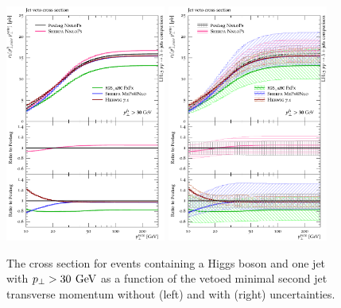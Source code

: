 \begin{figure}[t!]
  \centering
  \includegraphics[width=0.47\textwidth]{figures/hjetscomp_u_xs_jet_veto_j1_30.pdf}
  \hfill
  \includegraphics[width=0.47\textwidth]{figures/hjetscomp_xs_jet_veto_j1_30.pdf}
  \caption{
    The cross section for events containing a Higgs boson 
    and one jet with $p_\perp>30\,\text{\:GeV}$ as a function of
    the vetoed minimal second jet transverse momentum without
    (left) and with (right) uncertainties.
    \label{fig:hjetscomp:results:jvobs:jvxs1j30}
  }
\end{figure}

